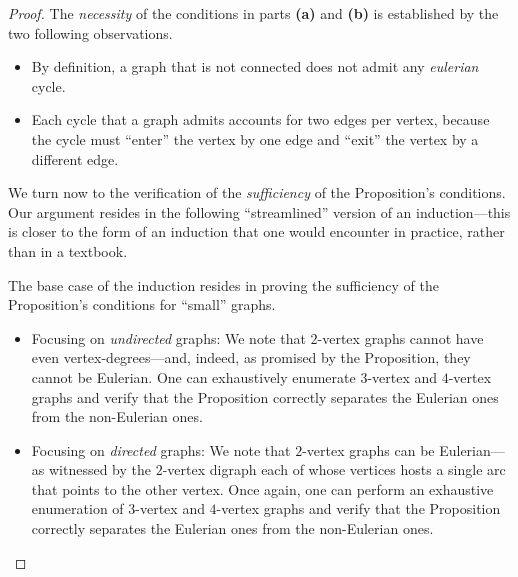 \begin{proof}
The {\em necessity} of the conditions in parts {\bf (a)} and {\bf (b)} is established by the two following observations.
\begin{itemize}
\item
By definition, a graph that is not connected does not admit any \textit{eulerian} cycle.
\item
Each cycle that a graph admits accounts for two edges per vertex,
because the cycle must ``enter'' the vertex by one edge and ``exit'' the
vertex by a different edge.
\end{itemize}

\smallskip

\noindent
We turn now to the verification of the {\em sufficiency} of the
Proposition's conditions.  Our argument resides in the following
``streamlined'' version of an induction---this is closer to the form
of an induction that one would encounter in practice, rather than in a
textbook.

The base case of the induction resides in proving the sufficiency of
the Proposition's conditions for ``small'' graphs.  
\bigskip

\noindent {}


\begin{itemize}
\item
Focusing on {\em undirected} graphs: We note that $2$-vertex graphs
cannot have even vertex-degrees---and, indeed, as promised by the
Proposition, they cannot be Eulerian.  One can exhaustively enumerate
$3$-vertex and $4$-vertex graphs and verify that the Proposition correctly
separates the Eulerian ones from the non-Eulerian ones.
\item
Focusing on {\em directed} graphs: We note that $2$-vertex graphs can be
Eulerian---as witnessed by the $2$-vertex digraph each of whose vertices
hosts a single arc that points to the other vertex.  Once again, one can
perform an exhaustive enumeration of $3$-vertex and $4$-vertex graphs
and verify that the Proposition correctly separates the Eulerian ones
from the non-Eulerian ones.
\end{itemize}


\end{proof}
